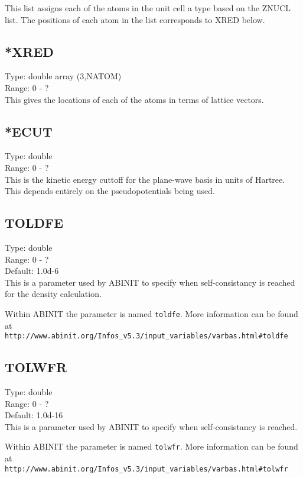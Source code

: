 \documentclass[12pt]{article}
\begin{document}
This list assigns each of the atoms in the unit cell a type based on the ZNUCL list. The positions of each atom in the list corresponds to XRED below.

\subsection{*XRED}
Type: double array (3,NATOM) \\
Range: 0 - ? \\

This gives the locations of each of the atoms in terms of lattice vectors.

\subsection{*ECUT}
Type: double \\
Range: 0 - ? \\

This is the kinetic energy cuttoff for the plane-wave basis in units of Hartree. This depends entirely on
the pseudopotentials being used.

\subsection{TOLDFE}
Type: double \\
Range: 0 - ? \\
Default: 1.0d-6\\

This is a parameter used by \textsc{ABINIT} to specify when 
self-consistancy is reached for the density calculation.

Within \textsc{ABINIT} the parameter is named \verb|toldfe|.
More information can be found at 
\\
\verb|http://www.abinit.org/Infos_v5.3/input_variables/varbas.html#toldfe|

\subsection{TOLWFR}
Type: double \\
Range: 0 - ? \\
Default: 1.0d-16 \\

This is a parameter used by \textsc{ABINIT} to specify when 
self-consistancy is reached. 

Within \textsc{ABINIT} the parameter is named \verb|tolwfr|.
More information can be found at 
\\ 
\verb|http://www.abinit.org/Infos_v5.3/input_variables/varbas.html#tolwfr|
\end{document}
